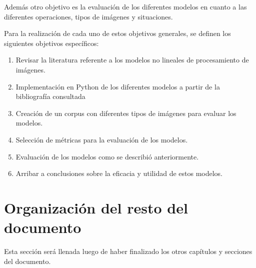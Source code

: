 Adem\'as otro objetivo es la evaluaci\'on de los diferentes modelos en cuanto a las diferentes operaciones, tipos de im\'agenes y situaciones.

Para la realizaci\'on de cada uno de estos objetivos generales, se definen los siguientes objetivos espec\'ificos:

\begin{enumerate}
	\item Revisar la literatura referente a los modelos no lineales de procesamiento de im\'agenes.
	\item Implementaci\'on en Python de los diferentes modelos a partir de la bibliograf\'ia consultada
	\item Creaci\'on de un corpus con diferentes tipos de im\'agenes para evaluar los modelos.
	\item Selecci\'on de m\'etricas para la evaluaci\'on de los modelos.
	\item Evaluaci\'on de los modelos como se describi\'o anteriormente.
	\item Arribar a conclusiones sobre la eficacia y utilidad de estos modelos. 
\end{enumerate}

\section*{Organizaci\'on del resto del documento}

Esta secci\'on ser\'a llenada luego de haber finalizado los otros cap\'itulos y secciones del documento.